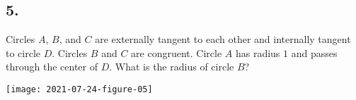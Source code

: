 \documentclass[12pt]{article}
\begin{document}
\subsection*{5.}

\nopagebreak

Circles $A$, $B$, and $C$ are externally tangent to each other and internally tangent to circle $D$. Circles $B$ and $C$ are congruent. Circle $A$ has radius $1$ and passes through the center of $D$. What is the radius of circle $B$?

\bigskip
\begin{center}
  \texttt{[image: 2021-07-24-figure-05]}
\end{center}
\bigskip

\end{document}
